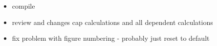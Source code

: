 \begin{itemize}
    \item compile
    \item review and changes cap calculations and all dependent calculations
    \item fix problem with figure numbering - probably just reset to default
\end{itemize}
